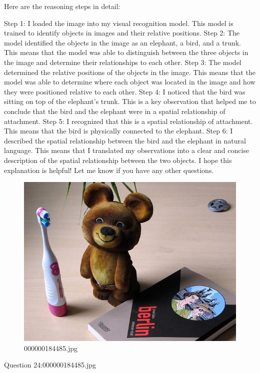 \begin{enumerate}
        Here are the reasoning steps in detail:
        
        Step 1: I loaded the image into my visual recognition model. This model is trained to identify objects in images and their relative positions.
        Step 2: The model identified the objects in the image as an elephant, a bird, and a trunk. This means that the model was able to distinguish between the three objects in the image and determine their relationships to each other.
        Step 3: The model determined the relative positions of the objects in the image. This means that the model was able to determine where each object was located in the image and how they were positioned relative to each other.
        Step 4: I noticed that the bird was sitting on top of the elephant's trunk. This is a key observation that helped me to conclude that the bird and the elephant were in a spatial relationship of attachment.
        Step 5: I recognized that this is a spatial relationship of attachment. This means that the bird is physically connected to the elephant.
        Step 6: I described the spatial relationship between the bird and the elephant in natural language. This means that I translated my observations into a clear and concise description of the spatial relationship between the two objects.
        I hope this explanation is helpful! Let me know if you have any other questions.
    \end{enumerate}
    \begin{figure}[h]
        \centering
        \includegraphics[width=0.8\linewidth]{../image set/easy/000000184485.jpg}
        \caption{000000184485.jpg}
    \end{figure}
    Question 24:000000184485.jpg
